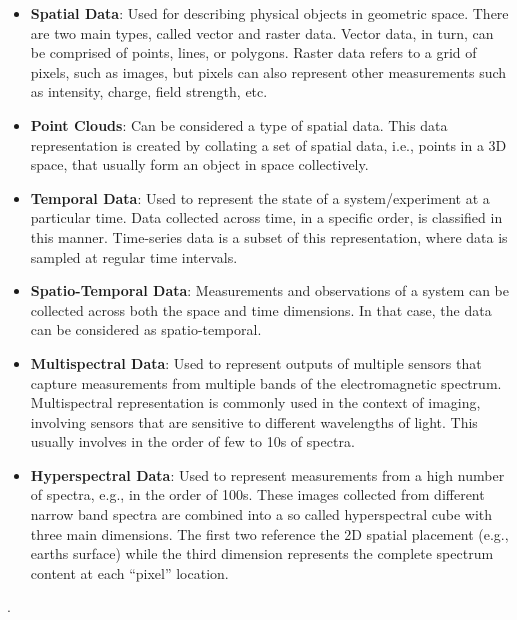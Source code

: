     \begin{itemize}
        \item \textbf{Spatial Data}: Used for describing physical objects in geometric space. There are two main types, called vector and raster data. Vector data, in turn, can be comprised of points, lines, or polygons. Raster data refers to a grid of pixels, such as images, but pixels can also represent other measurements such as intensity, charge, field strength, etc.
        \item \textbf{Point Clouds}: Can be considered a type of spatial data. This data representation is created by collating a set of spatial data, i.e., points in a 3D space, that usually form an object in space collectively. 
        \item \textbf{Temporal Data}: Used to represent the state of a system/experiment at a particular time. Data collected across time, in a specific order, is classified in this manner. Time-series data is a subset of this representation, where data is sampled at regular time intervals.
        \item \textbf{Spatio-Temporal Data}: Measurements and observations of a system can be collected across both the space and time dimensions. In that case, the data can be considered as spatio-temporal. 
        \item \textbf{Multispectral Data}: Used to represent outputs of multiple sensors that capture measurements from multiple bands of the electromagnetic spectrum. Multispectral representation is commonly used in the context of imaging, involving sensors that are sensitive to different wavelengths of light. This usually involves in the order of few to 10s of spectra.    
        \item \textbf{Hyperspectral Data}: Used to represent measurements from a high number of spectra, e.g., in the order of 100s. These images collected from different narrow band spectra are combined into a so called hyperspectral cube with three main dimensions. The first two reference the 2D spatial placement (e.g., earths surface) while the third dimension represents the complete spectrum content at each ``pixel'' location.  
    \end{itemize} .  
